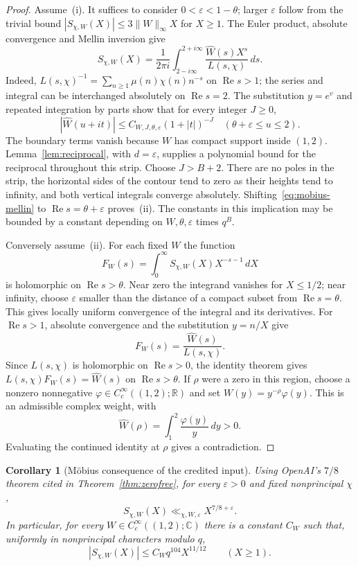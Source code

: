 \documentclass[screen,reqno]{aomart}
\numberwithin{equation}{section}
\newtheorem{corollary}[theorem]{Corollary}
\theoremstyle{definition}
\renewcommand{\Re}{\operatorname{Re}}
\newcommand{\C}{\mathbb{C}}
\newcommand{\R}{\mathbb{R}}
\begin{document}
\begin{proof}
Assume~(i). It suffices to consider $0<\varepsilon<1-\theta$; larger
$\varepsilon$ follow from the trivial bound
$|S_{\chi,W}(X)|\le3\|W\|_\infty X$ for $X\ge1$.
The Euler product, absolute convergence and Mellin inversion give
\begin{equation}\label{eq:mobius-mellin}
 S_{\chi,W}(X)=\frac{1}{2\pi i}
 \int_{2-i\infty}^{2+i\infty}
 \frac{\widehat W(s)X^s}{L(s,\chi)}\,ds.
\end{equation}
Indeed, $L(s,\chi)^{-1}=\sum_{n\ge1}\mu(n)\chi(n)n^{-s}$ on $\Re s>1$;
the series and integral can be interchanged absolutely on $\Re s=2$.
The substitution $y=e^v$ and repeated integration by parts show that
for every integer $J\ge0$,
\[
 |\widehat W(u+it)|\le C_{W,J,\theta,\varepsilon}(1+|t|)^{-J}
 \quad(\theta+\varepsilon\le u\le2).
\]
The boundary terms vanish because $W$ has compact support inside $(1,2)$.
Lemma~\ref{lem:reciprocal}, with $d=\varepsilon$, supplies a polynomial
bound for the reciprocal throughout this strip. Choose $J>B+2$.
There are no poles in the strip, the horizontal sides of the contour tend
to zero as their heights tend to infinity, and both vertical integrals
converge absolutely. Shifting~\eqref{eq:mobius-mellin} to
$\Re s=\theta+\varepsilon$ proves~(ii). The constants in this implication
may be bounded by a constant depending on $W,\theta,\varepsilon$ times $q^B$.

Conversely assume~(ii). For each fixed $W$ the function
\[
 F_W(s)=\int_0^\infty S_{\chi,W}(X)X^{-s-1}\,dX
\]
is holomorphic on $\Re s>\theta$. Near zero the integrand vanishes for
$X\le1/2$; near infinity, choose $\varepsilon$ smaller than the distance
of a compact subset from $\Re s=\theta$. This gives locally uniform
convergence of the integral and its derivatives. For $\Re s>1$, absolute
convergence and the substitution $y=n/X$ give
\[
 F_W(s)=\frac{\widehat W(s)}{L(s,\chi)}.
\]
Since $L(s,\chi)$ is holomorphic on $\Re s>0$, the identity theorem gives
$L(s,\chi)F_W(s)=\widehat W(s)$ on $\Re s>\theta$.
If $\rho$ were a zero in this region, choose a nonzero nonnegative
$\varphi\in C_c^\infty((1,2);\R)$ and set $W(y)=y^{-\rho}\varphi(y)$.
This is an admissible complex weight, with
\[
 \widehat W(\rho)=\int_1^2\frac{\varphi(y)}{y}\,dy>0.
\]
Evaluating the continued identity at $\rho$ gives a contradiction.
\end{proof}

\begin{corollary}[M\"obius consequence of the credited input]\label{cor:mobius}
Using OpenAI's $7/8$ theorem cited in Theorem~\ref{thm:zerofree}, for every
$\varepsilon>0$ and fixed nonprincipal $\chi$,
\[
 S_{\chi,W}(X)\ll_{\chi,W,\varepsilon} X^{7/8+\varepsilon}.
\]
In particular, for every $W\in C_c^\infty((1,2);\C)$ there is a constant
$C_W$ such that, uniformly in nonprincipal characters modulo $q$,
\begin{equation}\label{eq:mobius-consequence}
 |S_{\chi,W}(X)|\le C_W q^{104}X^{11/12}\qquad(X\ge1).
\end{equation}
\end{corollary}
\end{document}
